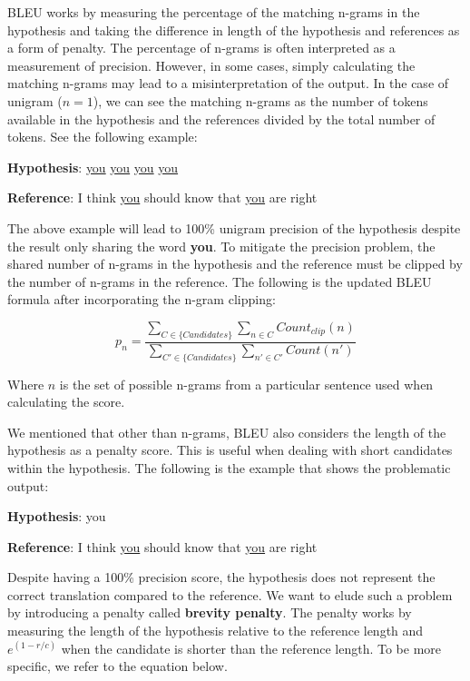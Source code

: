 BLEU works by measuring the percentage of the matching n-grams in the hypothesis and taking the difference in length of the hypothesis and references as a form of penalty. The percentage of n-grams is often interpreted as a measurement of precision. However, in some cases, simply calculating the matching n-grams may lead to a misinterpretation of the output. In the case of unigram ($n=1$), we can see the matching n-grams as the number of tokens available in the hypothesis and the references divided by the total number of tokens. See the following example:

\bigskip

\textbf{Hypothesis}: \underline{you} \underline{you} \underline{you} \underline{you}

\textbf{Reference}: I think \underline{you} should know that \underline{you} are right

\bigskip

The above example will lead to 100\% unigram precision of the hypothesis despite the result only sharing the word \textbf{you}. To mitigate the precision problem, the shared number of n-grams in the hypothesis and the reference must be clipped by the number of n-grams in the reference. The following is the updated BLEU formula after incorporating the n-gram clipping:

\begin{equation}
    p_n=\frac{\sum_{C\in\{Candidates\}}\sum_{n\in C}Count_{clip}(n)}{\sum_{C'\in\{Candidates\}}\sum_{n'\in C'}Count(n')}
\end{equation}

Where $n$ is the set of possible n-grams from a particular sentence used when calculating the score.

We mentioned that other than n-grams, BLEU also considers the length of the hypothesis as a penalty score. This is useful when dealing with short candidates within the hypothesis. The following is the example that shows the problematic output:

\bigskip

\textbf{Hypothesis}: you

\textbf{Reference}: I think \underline{you} should know that \underline{you} are right

\bigskip

Despite having a 100\% precision score, the hypothesis does not represent the correct translation compared to the reference. We want to elude such a problem by introducing a penalty called \textbf{brevity penalty}. The penalty works by measuring the length of the hypothesis relative to the reference length and  $e^{(1-r/c)}$ when the candidate is shorter than the reference length. To be more specific, we refer to the equation below.

